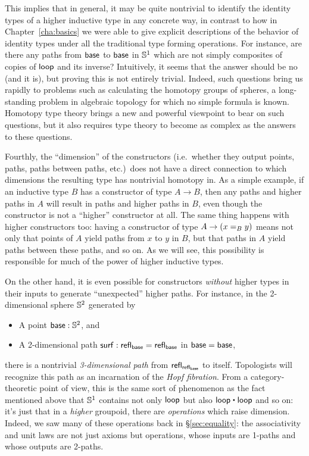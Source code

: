 This implies that in general, it may be quite nontrivial to identify the identity types of a higher inductive type in any concrete way, in contrast to how in Chapter~\ref{cha:basics} we were able to give explicit descriptions of the behavior of identity types under all the traditional type forming operations.
For instance, are there any paths from $\base$ to $\base$ in $\Sn^1$ which are not simply composites of copies of $\lloop$ and its inverse?
Intuitively, it seems that the answer should be no (and it is), but proving this is not entirely trivial.
Indeed, such questions bring us rapidly to problems such as calculating the homotopy groups of spheres, a long-standing problem in algebraic topology for which no simple formula is known.
Homotopy type theory brings a new and powerful viewpoint to bear on such questions, but it also requires type theory to become as complex as the answers to these questions.

Fourthly, the ``dimension'' of the constructors (i.e.\ whether they output points, paths, paths between paths, etc.)\ does not have a direct connection to which dimensions the resulting type has nontrivial homotopy in.
As a simple example, if an inductive type $B$ has a constructor of type $A\to B$, then any paths and higher paths in $A$ will result in paths and higher paths in $B$, even though the constructor is not a ``higher'' constructor at all.
The same thing happens with higher constructors too: having a constructor of type $A\to (\id[B]xy)$ means not only that points of $A$ yield paths from $x$ to $y$ in $B$, but that paths in $A$ yield paths between these paths, and so on.
As we will see, this possibility is responsible for much of the power of higher inductive types.

On the other hand, it is even possible for constructors \emph{without} higher types in their inputs to generate ``unexpected'' higher paths.
For instance, in the 2-dimensional sphere $\Sn^2$ generated by
\begin{itemize}
\item A point $\base:\Sn^2$, and
\item A 2-dimensional path $\mathsf{surf}:\refl{\base} = \refl{\base}$ in ${\base=\base}$,
\end{itemize}
there is a nontrivial \emph{3-dimensional path} from $\refl{\refl{\base}}$ to itself.
Topologists will recognize this path as an incarnation of the \emph{Hopf fibration}.
From a category-theoretic point of view, this is the same sort of phenomenon as the fact mentioned above that $\Sn^1$ contains not only $\lloop$ but also $\lloop\ct\lloop$ and so on: it's just that in a \emph{higher} groupoid, there are \emph{operations} which raise dimension.
Indeed, we saw many of these operations back in \S\ref{sec:equality}: the associativity and unit laws are not just axioms but operations, whose inputs are 1-paths and whose outputs are 2-paths.


